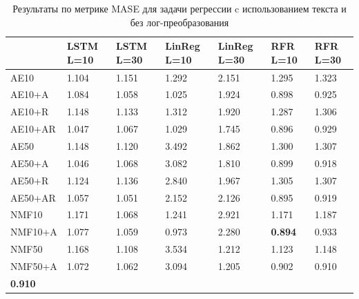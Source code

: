 \begin{center}
\begin{table}
 \begin{tabular}{||p{3.8cm}|p{1.5cm}|p{1.5cm}|p{1.5cm}|p{1.5cm}|p{1.5cm}|p{1.5cm}||} 
\hline
& LSTM L=10 & LSTM L=30 & LinReg L=10 & LinReg L=30 & RFR L=10 & RFR L=30\\ \hline\hline
AE10 & 1.104 & 1.151 & 1.292 & 2.151 & 1.295 & 1.323\\ \hline
AE10+A & 1.084 & 1.058 & 1.025 & 1.924 & 0.898 & 0.925\\ \hline
AE10+R & 1.148 & 1.133 & 1.312 & 1.920 & 1.287 & 1.306\\ \hline
AE10+AR & 1.047 & 1.067 & 1.029 & 1.745 & 0.896 & 0.929\\ \hline
AE50 & 1.148 & 1.120 & 3.492 & 1.862 & 1.300 & 1.307\\ \hline
AE50+A & 1.046 & 1.068 & 3.082 & 1.810 & 0.899 & 0.918\\ \hline
AE50+R & 1.124 & 1.136 & 2.840 & 1.967 & 1.305 & 1.307\\ \hline
AE50+AR & 1.057 & 1.051 & 2.152 & 2.126 & 0.895 & 0.919\\ \hline
NMF10 & 1.171 & 1.068 & 1.241 & 2.921 & 1.171 & 1.187\\ \hline
NMF10+A & 1.077 & 1.059 & 0.973 & 2.280 & \textbf{0.894} & 0.933\\ \hline
NMF50 & 1.168 & 1.108 & 3.534 & 1.212 & 1.123 & 1.148\\ \hline
NMF50+A & 1.072 & 1.062 & 3.094 & 1.205 & 0.902 & 0.910\\ \hline
\textbf{0.910}\\ \hline
\end{tabular}
\caption{\label{table:reg-res} Результаты по метрике MASE для задачи регрессии c использованием текста и без лог-преобразования}
\end{table}
\end{center}


